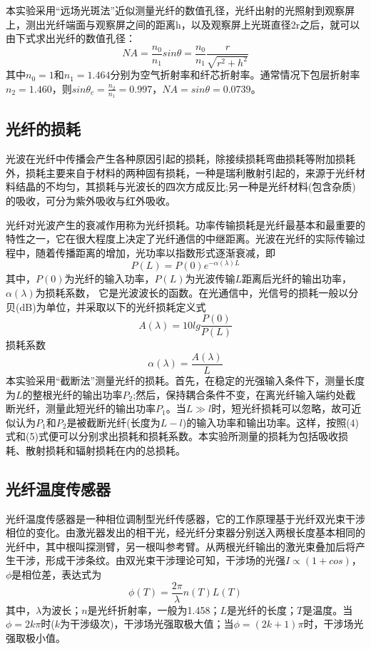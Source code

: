 \documentclass[UTF8]{ctexart}
\begin{document}
\begin{multicols}{2}
本实验采用“远场光斑法”近似测量光纤的数值孔径，光纤出射的光照射到观察屏上，测出光纤端面与观察屏之间的距离h，以及观察屏上光斑直径2r之后，就可以由下式求出光纤的数值孔径：
\begin{equation}
NA=\frac{n_0}{n_1}sin\theta=\frac{n_0}{n_1}\frac{r}{\sqrt{r^2+h^2}}
\end{equation}
其中$n_0=1$和$n_1=1.464$分别为空气折射率和纤芯折射率。通常情况下包层折射率$n_2=1.460$，则$sin\theta_c=\frac{n_2}{n_1}=0.997$，$NA=sin\theta=0.0739$。

\subsection{光纤的损耗}
光波在光纤中传播会产生各种原因引起的损耗，除接续损耗弯曲损耗等附加损耗外，损耗主要来自于材料的两种固有损耗，一种是瑞利散射引起的，来源于光纤材料结晶的不均匀，其损耗与光波长的四次方成反比;另一种是光纤材料(包含杂质)的吸收，可分为紫外吸收与红外吸收。

光纤对光波产生的衰减作用称为光纤损耗。功率传输损耗是光纤最基本和最重要的特性之一，它在很大程度上决定了光纤通信的中继距离。光波在光纤的实际传输过程中，随着传播距离的增加，光功率以指数形式逐渐衰减，即
\begin{equation}
P(L)=P(0)e^{-\alpha(\lambda)L}
\end{equation}
其中，$P(0)$为光纤的输入功率，$P(L)$为光波传输$L$距离后光纤的输出功率，$\alpha(\lambda)$为损耗系数，
它是光波波长的函数。在光通信中，光信号的损耗一般以分贝(dB)为单位，并采取以下的光纤损耗定义式
\begin{equation}
A(\lambda)=10lg\frac{P(0)}{P(L)}
\end{equation}
损耗系数
\begin{equation}
\alpha(\lambda)=\frac{A(\lambda)}{L}
\end{equation}
本实验采用“截断法”测量光纤的损耗。首先，在稳定的光强输入条件下，测量长度为$L$的整根光纤的输出功率$P_2$;然后，保持耦合条件不变，在离光纤输入端约处截断光纤，测量此短光纤的输出功率$P_1$。当$L\gg l$时，短光纤损耗可以忽略，故可近似认为$P_1$和$P_2$是被截断光纤(长度为$L-l$)的输入功率和输出功率。这样，按照(4)式和(5)式便可以分别求出损耗和损耗系数。本实验所测量的损耗为包括吸收损耗、散射损耗和辐射损耗在内的总损耗。

\subsection{光纤温度传感器}
光纤温度传感器是一种相位调制型光纤传感器，它的工作原理基于光纤双光束干涉相位的变化。由激光器发出的相干光，经光纤分束器分别送入两根长度基本相同的光纤中，其中根叫探测臂，另一根叫参考臂。从两根光纤输出的激光束叠加后将产生干涉，形成干涉条纹。由双光束干涉理论可知，干涉场的光强$I\propto(1+cos)$，$\phi$是相位差，表达式为
\begin{equation}
\phi(T)=\frac{2\pi}{\lambda}n(T)L(T)
\end{equation}
其中，$\lambda$为波长；$n$是光纤折射率，一般为1.458；$L$是光纤的长度；$T$是温度。当$\phi=2k\pi$时($k$为干涉级次)，干涉场光强取极大值；当$\phi=(2k+1)\pi$时，干涉场光强取极小值。


\end{multicols}
\end{document}
